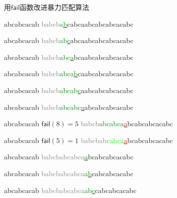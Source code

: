 \documentclass{ctexbeamer}
\newcommand{\red}[1]{\textcolor{red}{#1}}
\newcommand{\green}[1]{\textcolor{green}{#1}}
\newcommand{\gray}[1]{\textcolor{gray}{#1}}
\newcommand{\lime}[1]{\textcolor{lime}{#1}}
\newcommand{\fail}{\mathsf{fail}}
\newcommand{\ugrn}[1]{\underline{\green{#1}}}
\newcommand{\ured}[1]{\underline{\red{#1}}}
\begin{document}
\begin{frame}[fragile]{用$\fail$函数改进暴力匹配算法}
\begin{minipage}[t]{0.33\textwidth}
\begin{tverb}[fontsize=\tiny]
     abcabcacab
\gray{babcb}\green{a}\ugrn{b}cabcaabcabcabcacabc
\end{tverb}

\begin{tverb}[fontsize=\tiny]
     abcabcacab
\gray{babcb}\green{ab}\ugrn{c}abcaabcabcabcacabc
\end{tverb}
\end{minipage}%
%
\begin{minipage}[t]{0.33\textwidth}
\begin{tverb}[fontsize=\tiny]
     abcabcacab
\gray{babcb}\green{abc}\ugrn{a}bcaabcabcabcacabc
\end{tverb}

\begin{tverb}[fontsize=\tiny]
     abcabcacab
\gray{babcb}\green{abca}\underline{\green{b}}caabcabcabcacabc
\end{tverb}

\begin{tverb}[fontsize=\tiny]
     abcabcacab
\gray{babcb}\green{abcab}\underline{\green{c}}aabcabcabcacabc
\end{tverb}

\begin{tverb}[fontsize=\tiny]
     abcabcacab
\gray{babcb}\green{abcabc}\underline{\green{a}}abcabcabcacabc
\end{tverb}

\begin{tverb}[fontsize=\tiny]
     abcabcacab \(\scriptstyle\fail(8)=5\)
\gray{babcb}\green{abcabca}\ured{a}bcabcabcacabc
\end{tverb}

\begin{tverb}[fontsize=\tiny]
        abcabcacab \(\scriptstyle\fail(5)=1\)
\gray{babcbabc}\lime{abca}\ured{a}bcabcabcacabc
\end{tverb}

\begin{tverb}[fontsize=\tiny]
            abcabcacab
\gray{babcbabcabca}\ugrn{a}bcabcabcacabc
\end{tverb}

\begin{tverb}[fontsize=\tiny]
            abcabcacab
\gray{babcbabcabca}\green{a}\ugrn{b}cabcabcacabc
\end{tverb}

\begin{tverb}[fontsize=\tiny]
            abcabcacab
\gray{babcbabcabca}\green{ab}\ugrn{c}cabcabcacabc
\end{tverb}


\end{minipage}
\end{frame}
\end{document}

